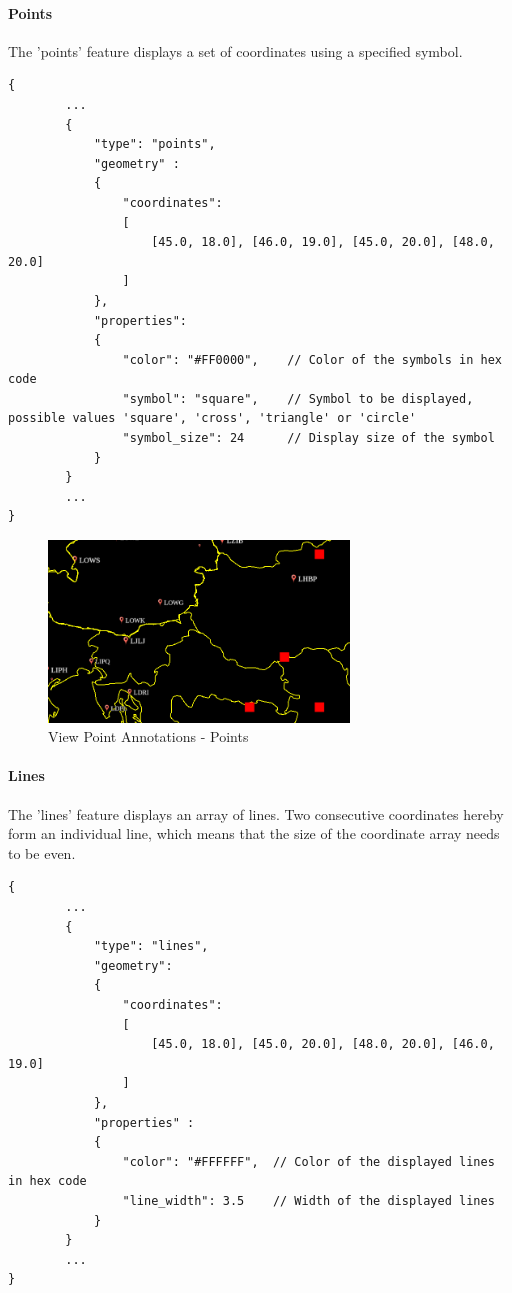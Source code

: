 
\paragraph{Points} The 'points' feature displays a set of coordinates using a specified symbol.

\begin{lstlisting}[basicstyle=\small\ttfamily]
{
        ...
        {
            "type": "points",
            "geometry" :
            {
                "coordinates": 
                [
                    [45.0, 18.0], [46.0, 19.0], [45.0, 20.0], [48.0, 20.0]
                ]
            },
            "properties":
            {
                "color": "#FF0000",    // Color of the symbols in hex code
                "symbol": "square",    // Symbol to be displayed, possible values 'square', 'cross', 'triangle' or 'circle'   
                "symbol_size": 24      // Display size of the symbol
            }
        }
        ...
}
\end{lstlisting}

\begin{figure}[H]
    \center
      \includegraphics[width=8cm]{figures/viewpoints_anno_example_points.png}
    \caption{View Point Annotations - Points} 
\end{figure}

\paragraph{Lines} The 'lines' feature displays an array of lines. 
Two consecutive coordinates hereby form an individual line, which means that the size of the coordinate array needs to be even.

\begin{lstlisting}[basicstyle=\small\ttfamily]
{
        ...
        {
            "type": "lines",
            "geometry":
            {
                "coordinates": 
                [
                    [45.0, 18.0], [45.0, 20.0], [48.0, 20.0], [46.0, 19.0]
                ]
            },
            "properties" :
            {
                "color": "#FFFFFF",  // Color of the displayed lines in hex code
                "line_width": 3.5    // Width of the displayed lines
            }
        }
        ...
}
\end{lstlisting}

